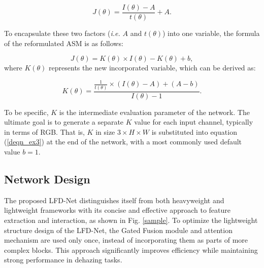 \documentclass[lettersize,journal]{IEEEtran}
\begin{document}
\begin{equation}
    \label{deqn_ex2}
    J(\theta) = \frac{I(\theta) - A}{t(\theta)} + A.
\end{equation}

To encapsulate these two factors (\textit{i.e.} $A$ and $t(\theta)$) into one variable, the formula of the reformulated ASM is as follows:

\begin{equation}
    \label{deqn_ex3}
    J(\theta) = K(\theta) \times I(\theta) - K(\theta) + b,
\end{equation}
where $K(\theta)$ represents the new incorporated variable, which can be derived as:

\begin{equation}
    \label{deqn_ex4}
    K(\theta) = \frac{\frac{1}{t(\theta)} \times (I(\theta) - A) + (A - b)}{I(\theta) - 1}.
\end{equation}

To be specific, $K$ is the intermediate evaluation parameter of the network. The ultimate goal is to generate a separate $K$ value for each input channel, typically in terms of RGB. That is, $K$ in size $3 \times H \times W$ is substituted into equation (\ref{deqn_ex3}) at the end of the network, with a most commonly used default value $b = 1$.

\subsection{Network Design}
The proposed LFD-Net distinguishes itself from both heavyweight and lightweight frameworks with its concise and effective approach to feature extraction and interaction, as shown in Fig. \ref{sample}. %
To optimize the lightweight structure design of the LFD-Net, the Gated Fusion module and attention mechanism are used only once, instead of incorporating them as parts of more complex blocks. This approach significantly improves efficiency while maintaining strong performance in dehazing tasks.
\end{document}
